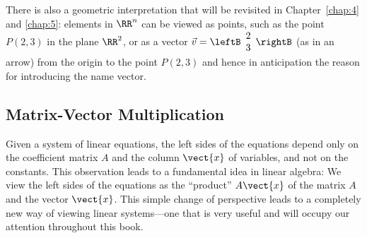There is also a geometric interpretation that will be revisited in Chapter~\ref{chap:4} and  \ref{chap:5}:  elements  in $\RR^{n}$ can be viewed as points, such as the point $P(2,3)$ in the plane  $\RR^{2}$, or as a vector  $\vec{v}=\leftB \begin{array}{c}
2\\
3 \end{array} \rightB$   (as in an arrow)  from the origin to the point $P(2,3)$ and hence in anticipation the reason for introducing the name vector. 

\subsection*{Matrix-Vector Multiplication}


Given a system of linear equations, the left sides of the equations depend only on the coefficient matrix $A$ and the column $\vect{x}$ of variables, and not on the constants. This observation leads to a fundamental idea in linear algebra: We view the left sides of the equations as the ``product'' $A\vect{x}$ of the matrix $A$ and the vector $\vect{x}$. This simple change of perspective leads to a completely new way of viewing linear systems---one that is very useful and will occupy our attention throughout this book.

